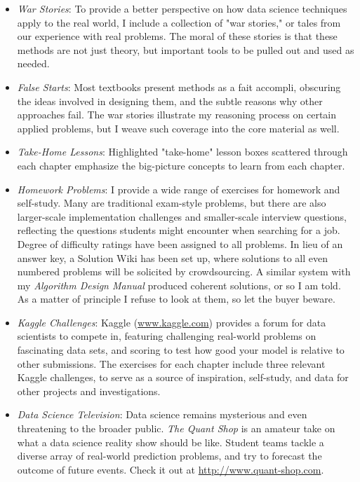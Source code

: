\documentclass[10pt]{article}
\begin{document}
\begin{itemize}
  \item \textit{War Stories}: To provide a better perspective on how data science techniques apply to the real world, I include a collection of "war stories," or tales from our experience with real problems. The moral of these stories is that these methods are not just theory, but important tools to be pulled out and used as needed.
  \item \textit{False Starts}: Most textbooks present methods as a fait accompli, obscuring the ideas involved in designing them, and the subtle reasons why other approaches fail. The war stories illustrate my reasoning process on certain applied problems, but I weave such coverage into the core material as well.
  \item \textit{Take-Home Lessons}: Highlighted "take-home" lesson boxes scattered through each chapter emphasize the big-picture concepts to learn from each chapter.
  \item \textit{Homework Problems}: I provide a wide range of exercises for homework and self-study. Many are traditional exam-style problems, but there are also larger-scale implementation challenges and smaller-scale interview questions, reflecting the questions students might encounter when searching for a job. Degree of difficulty ratings have been assigned to all problems.
In lieu of an answer key, a Solution Wiki has been set up, where solutions to all even numbered problems will be solicited by crowdsourcing. A similar system with my \textit{Algorithm Design Manual} produced coherent solutions, or so I am told. As a matter of principle I refuse to look at them, so let the buyer beware.
  \item \textit{Kaggle Challenges}: Kaggle (\href{http://www.kaggle.com}{www.kaggle.com}) provides a forum for data scientists to compete in, featuring challenging real-world problems on fascinating data sets, and scoring to test how good your model is relative to other submissions. The exercises for each chapter include three relevant Kaggle challenges, to serve as a source of inspiration, self-study, and data for other projects and investigations.
  \item \textit{Data Science Television}: Data science remains mysterious and even threatening to the broader public. \textit{The Quant Shop} is an amateur take on what a data science reality show should be like. Student teams tackle a diverse array of real-world prediction problems, and try to forecast the outcome of future events. Check it out at \href{http://www.quant-shop.com}{http://www.quant-shop.com}.


\end{itemize}
\end{document}
